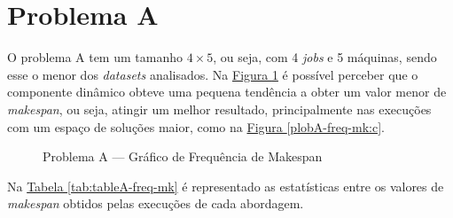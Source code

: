 \section{Problema A}
O problema A tem um tamanho $4 \times 5$, ou seja, com 4 \textit{jobs} e 5 máquinas, sendo esse o menor dos \textit{datasets} analisados.
Na \hyperref[fig:plobA-freq-mk]{Figura \ref{fig:plobA-freq-mk}} é possível perceber que o componente dinâmico obteve uma pequena tendência a obter um valor menor de \textit{makespan}, ou seja, atingir um melhor resultado, principalmente nas execuções com um espaço de soluções maior, como na \hyperref[plobA-freq-mk:c]{Figura \ref{plobA-freq-mk:c}}.
\begin{figure}[!htb]
    \caption{Problema A — Gráfico de Frequência de Makespan}
    \label{fig:plobA-freq-mk}
    \begin{minipage}{.5\linewidth}
        \centering
        \subfloat[]{
            \label{plobA-freq-mk:a}
            \resizebox{\linewidth}{!}{}
        }
    \end{minipage}%
    \begin{minipage}{.5\linewidth}
        \centering
        \subfloat[]{
            \label{plobA-freq-mk:b}
            \resizebox{\linewidth}{!}{}
        }
    \end{minipage}\par\medskip
      \centering
      \subfloat[]{
        \label{plobA-freq-mk:c}
        \resizebox{.5\linewidth}{!}{}
      }
\end{figure}
Na
\hyperref[tab:tableA-freq-mk]{Tabela \ref{tab:tableA-freq-mk}}
é representado as estatísticas entre os valores de \textit{makespan} obtidos pelas execuções de cada abordagem.
